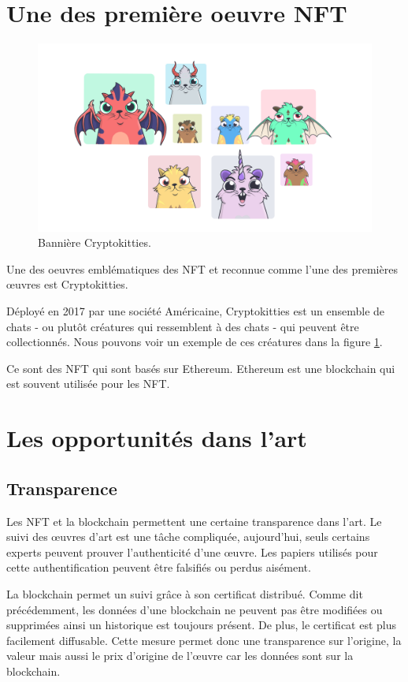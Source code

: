 \documentclass[11pt]{article}
\begin{document}
\section{Une des première oeuvre NFT} %
\begin{figure}
\centering
\includegraphics[width=1\textwidth]{press pack_v2-33.jpg}
\caption{\label{fig:Cryptokitties}Bannière Cryptokitties.}
\end{figure}
Une des oeuvres emblématiques des NFT et reconnue comme l'une des  premières œuvres est Cryptokitties. 

Déployé en 2017 par une société Américaine, Cryptokitties est un ensemble de chats - ou plutôt créatures qui ressemblent à des chats - qui peuvent être collectionnés. Nous pouvons voir un exemple de ces créatures dans la figure  \ref{fig:Cryptokitties}. 

Ce sont des NFT qui sont basés sur Ethereum. Ethereum est une blockchain qui est souvent utilisée pour les NFT.

\section{Les opportunités dans l'art} %
\subsection{Transparence} %
Les NFT et la blockchain permettent une certaine transparence dans l'art. 
Le suivi des œuvres d'art est une tâche compliquée, aujourd'hui, seuls certains experts peuvent prouver l'authenticité d'une œuvre. Les papiers utilisés pour cette authentification peuvent être falsifiés ou perdus aisément. 

La blockchain permet un suivi grâce à son certificat distribué. Comme dit précédemment, les données d'une blockchain ne peuvent pas être modifiées ou supprimées ainsi un historique est toujours présent. De plus, le certificat est plus facilement diffusable. Cette mesure permet donc une transparence sur l'origine, la valeur mais aussi le prix d'origine de l'œuvre car les données sont sur la blockchain. 
\end{document}
